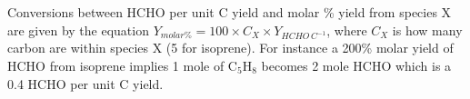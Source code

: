       Conversions between HCHO per unit C yield and molar \% yield from species X are given by the equation $ Y_{molar \%} = 100 \times C_X \times Y_{HCHO \,C^{-1}}$, where $C_X$ is how many carbon are within species X (5 for isoprene).
      For instance a 200\% molar yield of HCHO from isoprene implies 1 mole of C$_5$H$_8$ becomes 2 mole HCHO which is a 0.4 HCHO per unit C yield.
      
      
